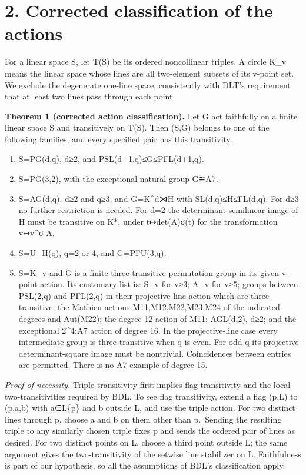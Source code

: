 \documentclass[
  11pt,
  a4paper,
]{article}
\begin{document}
\section{2. Corrected classification of the
actions}\label{corrected-classification-of-the-actions}

For a linear space S, let T(S) be its ordered noncollinear triples. A
circle K\_v means the linear space whose lines are all two-element
subsets of its v-point set. We exclude the degenerate one-line space,
consistently with DLT's requirement that at least two lines pass through
each point.

\textbf{Theorem 1 (corrected action classification).} Let G act
faithfully on a finite linear space S and transitively on T(S). Then
(S,G) belongs to one of the following families, and every specified pair
has this transitivity.

\begin{enumerate}
\def\labelenumi{(\alph{enumi})}
\item
  S=PG(d,q), d≥2, and PSL(d+1,q)≤G≤PΓL(d+1,q).
\item
  S=PG(3,2), with the exceptional natural group G≅A7.
\item
  S=AG(d,q), d≥2 and q≥3, and G=K\^{}d⋊H with SL(d,q)≤H≤ΓL(d,q). For d≥3
  no further restriction is needed. For d=2 the determinant-semilinear
  image of H must be transitive on K*, under t↦det(A)σ(t) for the
  transformation v↦v\^{}σ A.
\item
  S=U\_H(q), q=2 or 4, and G=PΓU(3,q).
\item
  S=K\_v and G is a finite three-transitive permutation group in its
  given v-point action. Its customary list is: S\_v for v≥3; A\_v for
  v≥5; groups between PSL(2,q) and PΓL(2,q) in their projective-line
  action which are three-transitive; the Mathieu actions
  M11,M12,M22,M23,M24 of the indicated degrees and Aut(M22); the
  degree-12 action of M11; AGL(d,2), d≥2; and the exceptional 2\^{}4:A7
  action of degree 16. In the projective-line case every intermediate
  group is three-transitive when q is even. For odd q its projective
  determinant-square image must be nontrivial. Coincidences between
  entries are permitted. There is no A7 example of degree 15.
\end{enumerate}

\emph{Proof of necessity.} Triple transitivity first implies flag
transitivity and the local two-transitivities required by BDL. To see
flag transitivity, extend a flag (p,L) to (p,a,b) with a∈L\{p\} and b
outside L, and use the triple action. For two distinct lines through p,
choose a and b on them other than p.~Sending the resulting triple to any
similarly chosen triple fixes p and sends the ordered pair of lines as
desired. For two distinct points on L, choose a third point outside L;
the same argument gives the two-transitivity of the setwise line
stabilizer on L. Faithfulness is part of our hypothesis, so all the
assumptions of BDL's classification apply.
\end{document}
